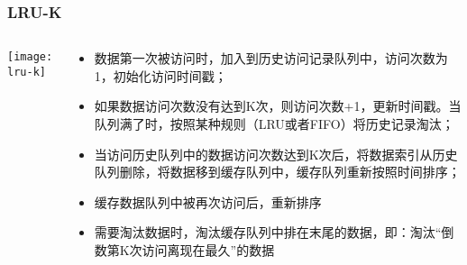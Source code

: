 \begin{frame}[plain]
	\frametitle{LRU-K}
	\begin{columns}
		\begin{column}{.4\textwidth}
			\centering
						\texttt{[image: lru-k]}
		\end{column}
		
		\begin{column}{.6\textwidth}
			
				\begin{itemize}
					
					\item 数据第一次被访问时，加入到历史访问记录队列中，访问次数为1，初始化访问时间戳；
					\item 如果数据访问次数没有达到K次，则访问次数+1，更新时间戳。当队列满了时，按照某种规则（LRU或者FIFO）将历史记录淘汰；%
					\item 当访问历史队列中的数据访问次数达到K次后，将数据索引从历史队列删除，将数据移到缓存队列中，缓存队列重新按照时间排序；
					\item 缓存数据队列中被再次访问后，重新排序
					\item 需要淘汰数据时，淘汰缓存队列中排在末尾的数据，即：淘汰“倒数第K次访问离现在最久”的数据
					
					
				\end{itemize}

			
		\end{column}
		
		
	\end{columns}
\end{frame}


